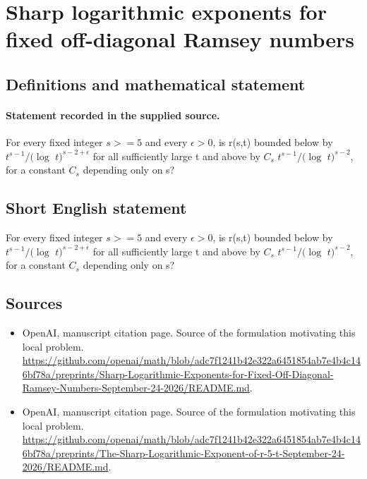 \documentclass[11pt]{article}
\begin{document}
\section*{Sharp logarithmic exponents for fixed off-diagonal Ramsey numbers}\label{30007103}
\subsection{Definitions and mathematical statement}
\paragraph{Statement recorded in the supplied source.}
For every fixed integer $s>=5$ and every $\epsilon >0$, is r(s,t) bounded below by $t^{s-1}/(\log $ $t)^{s-2+\epsilon }$ for all sufficiently large t and above by $C_s$ $t^{s-1}/(\log $ $t)^{s-2}$, for a constant $C_s$ depending only on s?
\subsection{Short English statement}
For every fixed integer $s>=5$ and every $\epsilon >0$, is r(s,t) bounded below by $t^{s-1}/(\log $ $t)^{s-2+\epsilon }$ for all sufficiently large t and above by $C_s$ $t^{s-1}/(\log $ $t)^{s-2}$, for a constant $C_s$ depending only on s?
\subsection{Sources}
\begin{itemize}
\item[S1] OpenAI, manuscript citation page. Source of the formulation motivating this local problem.
\url{https://github.com/openai/math/blob/adc7f1241b42e322a6451854ab7e4b4c146bf78a/preprints/Sharp-Logarithmic-Exponents-for-Fixed-Off-Diagonal-Ramsey-Numbers-September-24-2026/README.md}.
\item[S2] OpenAI, manuscript citation page. Source of the formulation motivating this local problem.
\url{https://github.com/openai/math/blob/adc7f1241b42e322a6451854ab7e4b4c146bf78a/preprints/The-Sharp-Logarithmic-Exponent-of-r-5-t-September-24-2026/README.md}.
\end{itemize}
\end{document}
